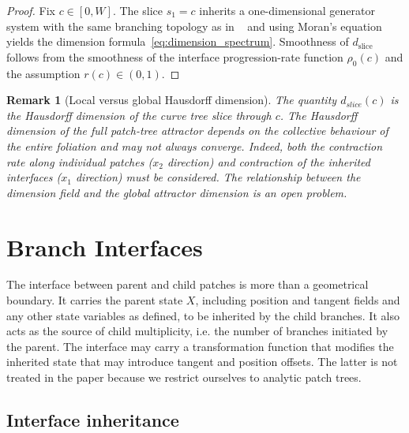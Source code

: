 \documentclass[11pt,a4paper]{article}
\newtheorem{remark}[theorem]{Remark}
\begin{document}
\begin{proof}
Fix $c\in[0,W]$. The slice $s_1=c$ inherits a one-dimensional
generator system with the same branching topology as in ~\cite{mulder2026} and
using Moran's  equation~\cite{falconer2003} yields the dimension 
formula~\eqref{eq:dimension_spectrum}. 
Smoothness of $d_{\mathrm{slice}}$ follows from the smoothness
of the interface progression-rate function $\rho_0(c)$ and the
assumption $r(c)\in(0,1)$.
\end{proof}

\begin{remark}[Local versus global Hausdorff dimension]
\label{rem:local_global_dim}
The quantity $d_{slice}(c)$ is the Hausdorff dimension of the curve tree
slice through $c$. The Hausdorff dimension of the full patch-tree attractor 
depends on the collective behaviour of the entire foliation and may not always
converge. Indeed, both the contraction rate along individual patches ($x_2$ direction) and
contraction of the inherited interfaces ($x_1$ direction) must be considered.
The relationship between the dimension field and the global attractor dimension 
is an open problem.
\end{remark}

\section{Branch Interfaces}
\label{sec:interfaces}

The interface between parent and child patches is more than a geometrical
boundary. It carries the parent state $X$, including position and tangent fields
and any other state variables as defined, to be inherited by the child branches. 
It also acts as the source of child multiplicity, i.e. the number of branches 
initiated by the parent. The interface may carry a transformation function 
that modifies the inherited state that may introduce tangent and position offsets. 
The latter is not treated in the paper because we restrict ourselves to 
analytic patch trees. 
\subsection{Interface inheritance}
\label{sec:inheritance}
\end{document}
